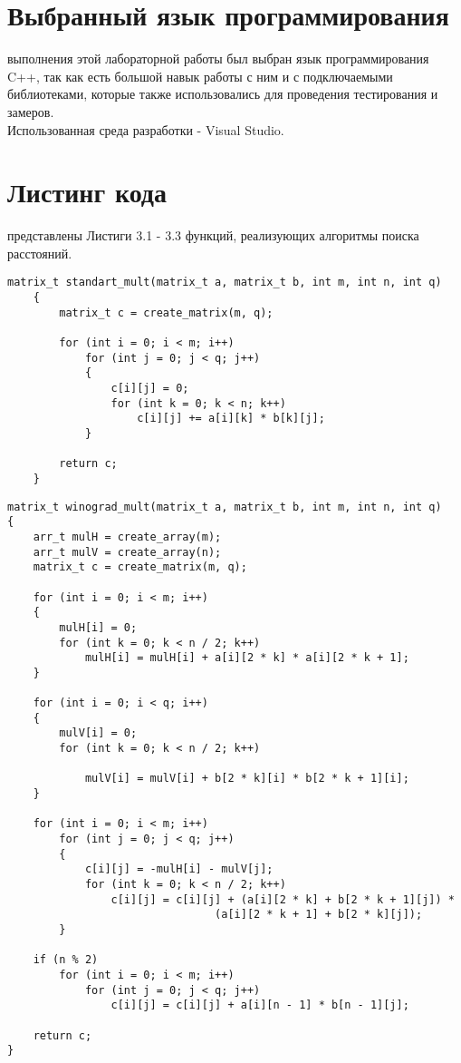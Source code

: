 \section{Выбранный язык программирования}
 выполнения этой лабораторной работы был выбран язык программирования C++, так как есть большой навык работы с ним и с подключаемыми библиотеками, которые также использовались для проведения тестирования и замеров.\\

Использованная среда разработки - Visual Studio.

\section{Листинг кода}
 представлены Листиги 3.1 - 3.3 функций, реализующих алгоритмы поиска расстояний.
\begin{lstlisting}[label=code, caption = Стандартный алгоритм умножения матриц]
	matrix_t standart_mult(matrix_t a, matrix_t b, int m, int n, int q)
	{
		matrix_t c = create_matrix(m, q);
		
		for (int i = 0; i < m; i++)
			for (int j = 0; j < q; j++)
			{
				c[i][j] = 0;
				for (int k = 0; k < n; k++)
					c[i][j] += a[i][k] * b[k][j];
			}
		
		return c;
	}
\end{lstlisting}

\begin{lstlisting}[label=code, caption = Алгоритм Винограда]
matrix_t winograd_mult(matrix_t a, matrix_t b, int m, int n, int q)
{
	arr_t mulH = create_array(m);
	arr_t mulV = create_array(n);
	matrix_t c = create_matrix(m, q);
	
	for (int i = 0; i < m; i++)
	{
		mulH[i] = 0;
		for (int k = 0; k < n / 2; k++)
			mulH[i] = mulH[i] + a[i][2 * k] * a[i][2 * k + 1];
	}
	
	for (int i = 0; i < q; i++)
	{
		mulV[i] = 0;
		for (int k = 0; k < n / 2; k++)
			
			mulV[i] = mulV[i] + b[2 * k][i] * b[2 * k + 1][i];
	}
	
	for (int i = 0; i < m; i++)
		for (int j = 0; j < q; j++)
		{
			c[i][j] = -mulH[i] - mulV[j];
			for (int k = 0; k < n / 2; k++)
				c[i][j] = c[i][j] + (a[i][2 * k] + b[2 * k + 1][j]) * 
						  		(a[i][2 * k + 1] + b[2 * k][j]);
		}
	
	if (n % 2)
		for (int i = 0; i < m; i++)
			for (int j = 0; j < q; j++)
				c[i][j] = c[i][j] + a[i][n - 1] * b[n - 1][j];
	
	return c;
}
\end{lstlisting}

